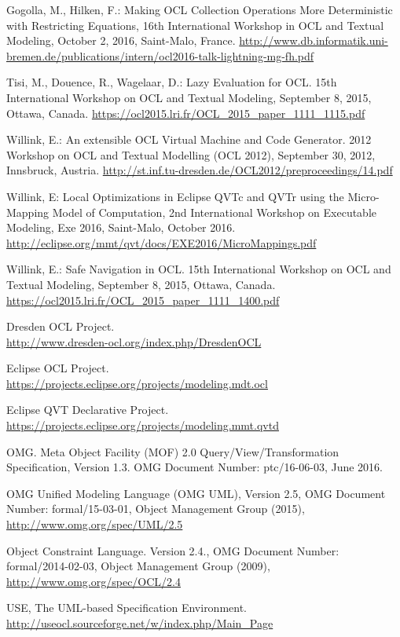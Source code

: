 \documentclass{llncs}
\begin{document}
%
%
\begin{thebibliography}{}
%
Gogolla, M., Hilken, F.: Making OCL Collection Operations More Deterministic with Restricting Equations, 16th International Workshop in OCL and Textual Modeling, October 2, 2016, Saint-Malo, France.
\url{http://www.db.informatik.uni-bremen.de/publications/intern/ocl2016-talk-lightning-mg-fh.pdf}

Tisi, M., Douence, R., Wagelaar, D.: Lazy Evaluation for OCL.
15th International Workshop on OCL and Textual Modeling, September 8, 2015, Ottawa, Canada.
\url{https://ocl2015.lri.fr/OCL\_2015\_paper\_1111\_1115.pdf}

Willink, E.: An extensible OCL Virtual Machine and Code Generator.
2012 Workshop on OCL and Textual Modelling (OCL 2012), September 30, 2012, Innsbruck, Austria.
\url{http://st.inf.tu-dresden.de/OCL2012/preproceedings/14.pdf}

Willink, E: Local Optimizations in Eclipse QVTc and QVTr using the Micro-Mapping Model of Computation,
2nd International Workshop on Executable Modeling, Exe 2016, Saint-Malo, October 2016.
\url{http://eclipse.org/mmt/qvt/docs/EXE2016/MicroMappings.pdf}

Willink, E.: Safe Navigation in OCL.
15th International Workshop on OCL and Textual Modeling, September 8, 2015, Ottawa, Canada.
\url{https://ocl2015.lri.fr/OCL\_2015\_paper\_1111\_1400.pdf}

Dresden OCL Project.\\
\url{http://www.dresden-ocl.org/index.php/DresdenOCL}

Eclipse OCL Project.\\
\url{https://projects.eclipse.org/projects/modeling.mdt.ocl}

Eclipse QVT Declarative Project.\\
\url{https://projects.eclipse.org/projects/modeling.mmt.qvtd}

OMG. Meta Object Facility (MOF) 2.0 Query/View/Transformation Specification, Version 1.3.
OMG Document Number: ptc/16-06-03, June 2016.

OMG Unified Modeling Language (OMG UML), Version 2.5, {OMG Document Number}: formal/15-03-01, Object Management Group (2015), \url{http://www.omg.org/spec/UML/2.5}

Object Constraint Language. Version 2.4., OMG Document Number: formal/2014-02-03, Object Management Group (2009),  \url{http://www.omg.org/spec/OCL/2.4}

USE, The UML-based Specification Environment. \url{http://useocl.sourceforge.net/w/index.php/Main\_Page}
\end{thebibliography}
\end{document}
